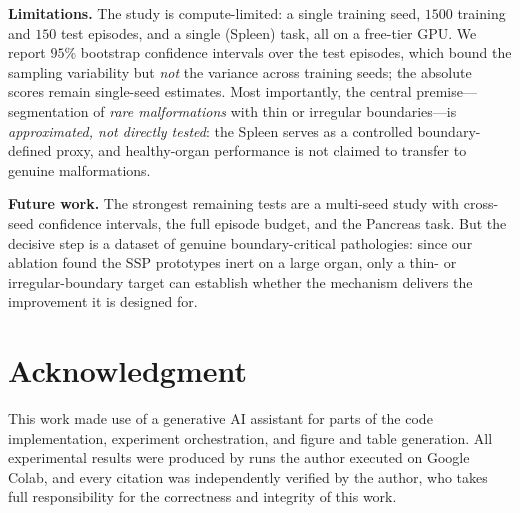 \documentclass[conference]{IEEEtran}
\begin{document}
\textbf{Limitations.} The study is compute-limited: a single training seed, $1500$ training and
$150$ test episodes, and a single (Spleen) task, all on a free-tier GPU. We report $95\%$
bootstrap confidence intervals over the test episodes, which bound the sampling variability but
\emph{not} the variance across training seeds; the absolute scores remain single-seed estimates.
Most importantly, the central premise---segmentation of \emph{rare malformations} with thin or
irregular boundaries---is \emph{approximated, not directly tested}: the Spleen serves as a
controlled boundary-defined proxy, and healthy-organ performance is not claimed to transfer to
genuine malformations.

\textbf{Future work.} The strongest remaining tests are a multi-seed study with cross-seed
confidence intervals, the full episode budget, and the Pancreas task. But the decisive step is a
dataset of genuine boundary-critical pathologies: since our ablation found the SSP prototypes inert
on a large organ, only a thin- or irregular-boundary target can establish whether the mechanism
delivers the improvement it is designed for.

\section*{Acknowledgment}
This work made use of a generative AI assistant for parts of the code implementation, experiment
orchestration, and figure and table generation. All experimental results were produced by runs the
author executed on Google Colab, and every citation was independently verified by the author, who
takes full responsibility for the correctness and integrity of this work.



\end{document}
